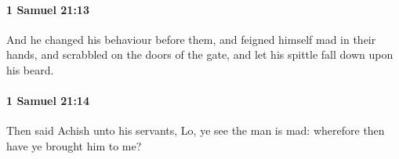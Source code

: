 		\paragraph{1 Samuel 21:13} %
			\label{1SAMUEL-21-13}

			And he changed his behaviour before them, and feigned himself mad in their hands, and scrabbled on the doors of the gate, and let his spittle fall down upon his beard.


		\paragraph{1 Samuel 21:14} %
			\label{1SAMUEL-21-14}

			Then said Achish unto his servants, Lo, ye see the man is mad: wherefore then have ye brought him to me?


